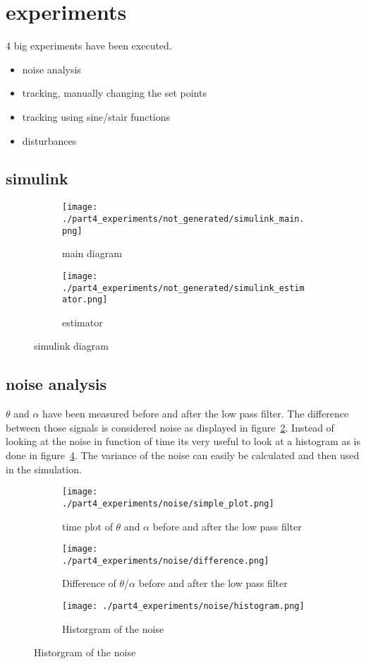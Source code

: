 \section{experiments}

	4 big experiments have been executed.
	
	\begin{itemize}
		\item noise analysis
		\item tracking, manually changing the set points
		\item tracking using sine/stair functions
		\item disturbances
	\end{itemize}

\subsection{simulink}
	\begin{figure}[H]
	\centering
	\begin{subfigure}[b]{0.45\textwidth}
		\texttt{[image: ./part4\_experiments/not\_generated/simulink\_main.png]}
		\caption{main diagram}
	\end{subfigure}
	\begin{subfigure}[b]{0.45\textwidth}
		\texttt{[image: ./part4\_experiments/not\_generated/simulink\_estimator.png]}
		\caption{estimator}
	\end{subfigure}
	\caption{simulink diagram}
\end{figure}
\subsection{noise analysis}
	$\theta$ and $\alpha$ have been measured before and after the low pass filter. The difference between those signals is considered noise as displayed in figure~\ref{fig:time plot noise}. Instead of looking at the noise in function of time its very useful to look at a histogram as is done in figure~\ref{fig:hist noise}. The variance of the noise can easily be calculated and then used in the simulation.
	
	\begin{figure}[H]
		\centering
		\begin{subfigure}[b]{0.45\textwidth}
			\texttt{[image: ./part4\_experiments/noise/simple\_plot.png]}
			\caption{time plot of $\theta$ and $\alpha$ before and after the low pass filter}
			\label{fig:time plot theta and alpha}
		\end{subfigure}
		\begin{subfigure}[b]{0.45\textwidth}
			\texttt{[image: ./part4\_experiments/noise/difference.png]}
			\caption{Difference of $\theta$/$\alpha$ before and after the low pass filter}
			\label{fig:time plot noise}
		\end{subfigure}
		\begin{subfigure}[b]{0.45\textwidth}
			\texttt{[image: ./part4\_experiments/noise/histogram.png]}
			\caption{Historgram of the noise}
			\label{fig:hist noise}
		\end{subfigure}
	\end{figure}

